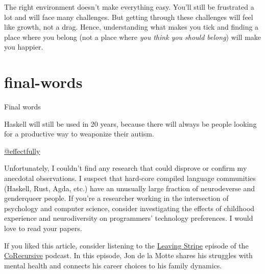 \documentclass{article}
\begin{document}
The right environment doesn't make everything easy.
You'll still be frustrated a lot and will face many challenges.
But getting through these challenges will feel like growth, not a drag.
Hence, understanding what makes you tick and finding a place where you belong (not a place where \emph{you think you should belong}) will make you happier.

\section{final-words}{Final words}

\epigraph{
  Haskell will still be used in 20 years,
  because there will always be people looking for a productive way to weaponize their autism.
}{\href{https://x.com/effectfully/status/1901124439258894769}{@effectfully}}

Unfortunately, I couldn't find any research that could disprove or confirm my anecdotal observations.
I suspect that hard-core compiled language communities (Haskell, Rust, Agda, etc.) have an unusually large fraction of neurodeverse and genderqueer people.
If you're a researcher working in the intersection of psychology and computer science, consider investigating the effects of childhood experience and neurodiversity on programmers' technology preferences.
I would love to read your papers.

If you liked this article,
consider listening to the \href{https://corecursive.com/leaving-stripe-with-jon-de-le-motte/}{Leaving Stripe} episode of the \href{https://corecursive.com/}{CoRecursive} podcast.
In this episode, Jon de la Motte shares his struggles with mental health and connects his career choices to his family dynamics.
\end{document}
